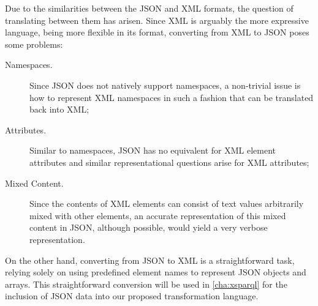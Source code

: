 Due to the similarities between the \ac{JSON} and \ac{XML} formats, the question of translating between them has arisen.
Since \ac{XML} is arguably the more expressive language, being more flexible in its format, converting from \ac{XML} to
\ac{JSON} poses some problems:
%
\begin{description}
\item[Namespaces.]  Since \ac{JSON} does not natively support namespaces, a non-trivial issue is how to represent
  \ac{XML} namespaces in such a fashion that can be translated back into \ac{XML};
\item[Attributes.]  Similar to namespaces, \ac{JSON} has no equivalent for \ac{XML} element attributes and similar
  representational questions arise for \ac{XML} attributes;
\item[Mixed Content.]  Since the contents of \ac{XML} elements can consist of text values arbitrarily mixed with other
  elements, an accurate representation of this mixed content in \ac{JSON}, although possible, would yield a very verbose
  representation.
\end{description}
%
On the other hand, converting from \ac{JSON} to \ac{XML} is a straightforward task, relying solely on using predefined
element names to represent \ac{JSON} objects and arrays.  This straightforward conversion will be used in
\cref{cha:xsparql} for the inclusion of \ac{JSON} data into our proposed transformation language.



